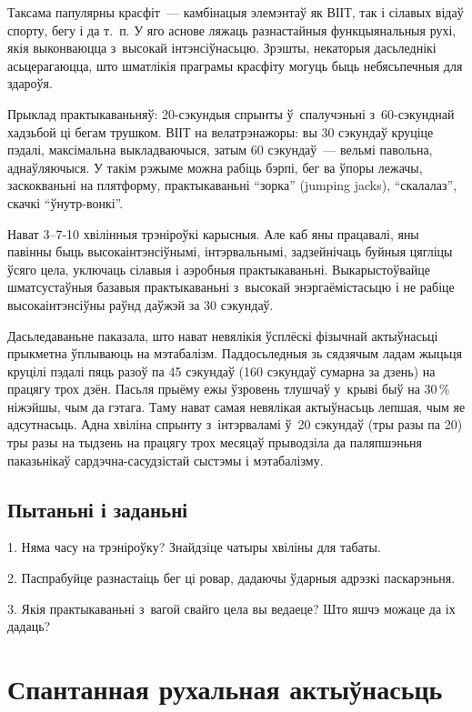 Таксама папулярны красфіт~--- камбінацыя элемэнтаў як ВІІТ, так і сілавых відаў спорту, бегу і да т.~п. У яго аснове ляжаць разнастайныя функцыянальныя рухі, якія выконваюцца з~высокай інтэнсіўнасьцю. Зрэшты, некаторыя дасьледнікі асьцерагаюцца, што шматлікія праграмы красфіту могуць быць небясьпечныя для здароўя.

Прыклад практыкаваньняў: 20-сэкундыя спрынты ў~спалучэньні з~60-сэкунднай хадзьбой ці бегам трушком. ВІІТ на велатрэнажоры: вы 30 сэкундаў круціце пэдалі, максімальна выкладваючыся, затым 60 сэкундаў~--- вельмі павольна, аднаўляючыся. У такім рэжыме можна рабіць бэрпі, бег ва ўпоры лежачы, заскокваньні на плятформу, практыкаваньні ``зорка'' (jumping jacks), ``скалалаз'', скачкі ``ўнутр-вонкі''.

Нават 3--7-10 хвілінныя трэніроўкі карысныя. Але каб яны працавалі, яны павінны быць высокаінтэнсіўнымі, інтэрвальнымі, задзейнічаць буйныя цягліцы ўсяго цела, уключаць сілавыя і аэробныя практыкаваньні. Выкарыстоўвайце шматсустаўныя базавыя практыкаваньні з~высокай энэргаёмістасьцю і не рабіце высокаінтэнсіўны раўнд даўжэй за 30 сэкундаў. 

Дасьледаваньне паказала, што нават невялікія ўсплёскі фізычнай актыўнасьці прыкметна ўплываюць на мэтабалізм. Паддосьледныя зь сядзячым ладам жыцьця круцілі пэдалі пяць разоў па 45 сэкундаў (160 сэкундаў сумарна за дзень) на працягу трох дзён. Пасьля прыёму ежы ўзровень тлушчаў у~крыві быў на 30\,\% ніжэйшы, чым да гэтага. Таму нават самая невялікая актыўнасьць лепшая, чым яе адсутнасьць. Адна хвіліна спрынту з~інтэрваламі ў~20 сэкундаў (тры разы па 20) тры разы на тыдзень на працягу трох месяцаў прыводзіла да паляпшэньня паказьнікаў сардэчна-сасудзістай сыстэмы і мэтабалізму.

\subsection*{Пытаньні і заданьні}

1. Няма часу на трэніроўку? Знайдзіце чатыры хвіліны для табаты.

2. Паспрабуйце разнастаіць бег ці ровар, дадаючы ўдарныя адрэзкі паскарэньня.

3. Якія практыкаваньні з~вагой свайго цела вы ведаеце? Што яшчэ можаце да іх дадаць?


\section{Спантанная рухальная актыўнасьць}


